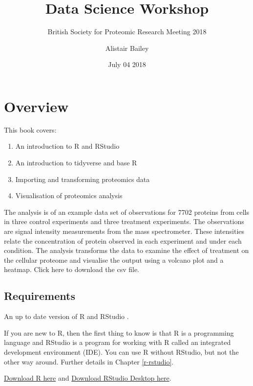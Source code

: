 \documentclass[12pt,]{book}
\title{Data Science Workshop}
\subtitle{British Society for Proteomic Research Meeting 2018}
\author{Alistair Bailey}
\date{July 04 2018}
\providecommand{\tightlist}{%
  \setlength{\itemsep}{0pt}\setlength{\parskip}{0pt}}
\theoremstyle{definition}
\theoremstyle{definition}
\theoremstyle{definition}
\theoremstyle{remark}
\begin{document}
\maketitle

{
\setcounter{tocdepth}{1}
\tableofcontents
}
\chapter*{Overview}\label{overview}

This book covers:

\begin{enumerate}
\def\labelenumi{\arabic{enumi}.}
\tightlist
\item
  An introduction to R and RStudio
\item
  An introduction to tidyverse and base R
\item
  Importing and transforming proteomics data
\item
  Visualisation of proteomics analysis
\end{enumerate}

The analysis is of an example data set of observations for 7702 proteins
from cells in three control experiments and three treatment experiments.
The observations are signal intensity measurements from the mass
spectrometer. These intensities relate the concentration of protein
observed in each experiment and under each condition. The analysis
transforms the data to examine the effect of treatment on the cellular
proteome and visualise the output using a volcano plot and a heatmap.
Click here to download the csv file.

\section*{Requirements}\label{requirements}

An up to date version of R \citep{R-base} and RStudio
\citep{rstudioteam2018}.

If you are new to R, then the first thing to know is that R is a
programming language and RStudio is a program for working with R called
an integrated development environment (IDE). You can use R without
RStudio, but not the other way around. Further details in Chapter
\ref{r-rstudio}.

\href{https://cran.r-project.org/}{Download R here} and
\href{https://www.rstudio.com/products/rstudio/download/}{Download
RStudio Desktop here}.
\end{document}

